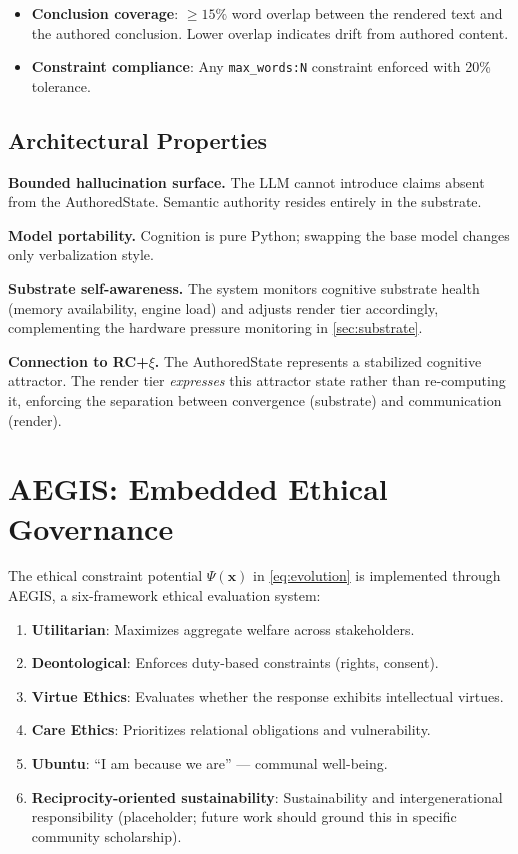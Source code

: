 \documentclass[11pt,a4paper]{article}
\begin{document}
\begin{itemize}[nosep]
  \item \textbf{Conclusion coverage}: $\geq 15\%$ word overlap between the
    rendered text and the authored conclusion. Lower overlap indicates drift
    from authored content.
  \item \textbf{Constraint compliance}: Any \texttt{max\_words:N} constraint
    enforced with 20\% tolerance.
\end{itemize}

\subsection{Architectural Properties}

\textbf{Bounded hallucination surface.} The LLM cannot introduce claims absent
from the AuthoredState. Semantic authority resides entirely in the substrate.

\textbf{Model portability.} Cognition is pure Python; swapping the base model
changes only verbalization style.

\textbf{Substrate self-awareness.} The system monitors cognitive substrate
health (memory availability, engine load) and adjusts render tier accordingly,
complementing the hardware pressure monitoring in \cref{sec:substrate}.

\textbf{Connection to RC+$\xi$.} The AuthoredState represents a stabilized
cognitive attractor. The render tier \emph{expresses} this attractor state
rather than re-computing it, enforcing the separation between convergence
(substrate) and communication (render).

\section{AEGIS: Embedded Ethical Governance}
\label{sec:aegis}

The ethical constraint potential $\Psi(\mathbf{x})$ in \cref{eq:evolution}
is implemented through AEGIS, a six-framework ethical evaluation system:

\begin{enumerate}[nosep]
  \item \textbf{Utilitarian}: Maximizes aggregate welfare across stakeholders.
  \item \textbf{Deontological}: Enforces duty-based constraints (rights,
    consent).
  \item \textbf{Virtue Ethics}: Evaluates whether the response exhibits
    intellectual virtues.
  \item \textbf{Care Ethics}: Prioritizes relational obligations and
    vulnerability.
  \item \textbf{Ubuntu}: ``I am because we are'' --- communal well-being.
  \item \textbf{Reciprocity-oriented sustainability}: Sustainability and
    intergenerational responsibility (placeholder; future work should ground
    this in specific community scholarship).
\end{enumerate}
\end{document}
